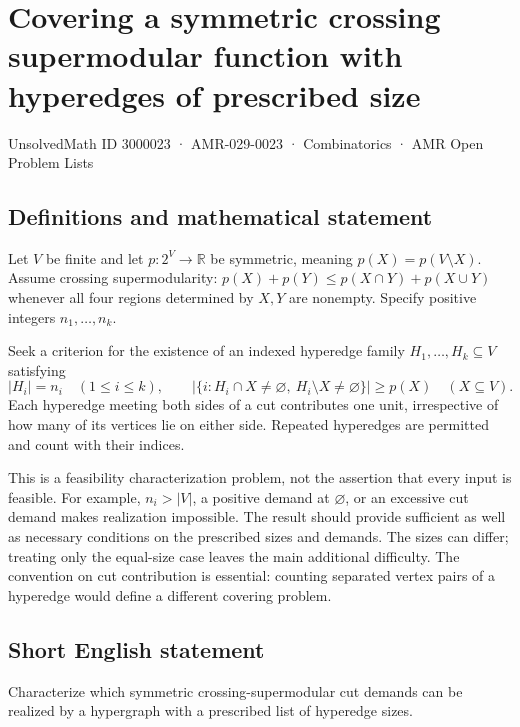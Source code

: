 \documentclass[11pt,a4paper]{article}
\begin{document}
\section*{Covering a symmetric crossing supermodular function with hyperedges of prescribed size}\label{3000023}
{\small UnsolvedMath ID 3000023 · AMR-029-0023 · Combinatorics · AMR Open Problem Lists}
\subsection{Definitions and mathematical statement}
Let $V$ be finite and let $p:2^V\to\mathbb R$ be symmetric,
meaning $p(X)=p(V\setminus X)$. Assume crossing supermodularity:
$p(X)+p(Y)\le p(X\cap Y)+p(X\cup Y)$ whenever all four regions
determined by $X,Y$ are nonempty.
Specify positive integers $n_1,\ldots,n_k$.

Seek a criterion for the existence of an indexed hyperedge family
$H_1,\ldots,H_k\subseteq V$ satisfying
\[
 |H_i|=n_i\quad(1\le i\le k),\qquad
 |\{i:H_i\cap X\ne\varnothing,\ H_i\setminus X\ne\varnothing\}|
                                      \ge p(X)\quad(X\subseteq V).
\]
Each hyperedge meeting both sides of a cut contributes one unit,
irrespective of how many of its vertices lie on either side. Repeated
hyperedges are permitted and count with their indices.

This is a feasibility characterization problem, not the assertion that
every input is feasible. For example, $n_i>|V|$, a positive demand at
$\varnothing$, or an excessive cut demand makes realization impossible.
The result should provide sufficient as well as necessary conditions
on the prescribed sizes and demands. The sizes can differ; treating
only the equal-size case leaves the main additional difficulty.
The convention on cut contribution is essential: counting separated
vertex pairs of a hyperedge would define a different covering problem.
\subsection{Short English statement}
Characterize which symmetric crossing-supermodular cut demands
can be realized by a hypergraph with a prescribed list of hyperedge sizes.
\end{document}
